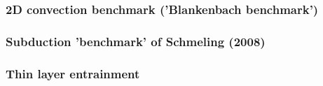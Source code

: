 \subsubsection{2D convection benchmark ('Blankenbach \etal benchmark')} \label{ss:blbc89}


\subsubsection{Subduction 'benchmark' of Schmeling \etal (2008)}


\subsubsection{Thin layer entrainment} \label{sec:tlentr}

